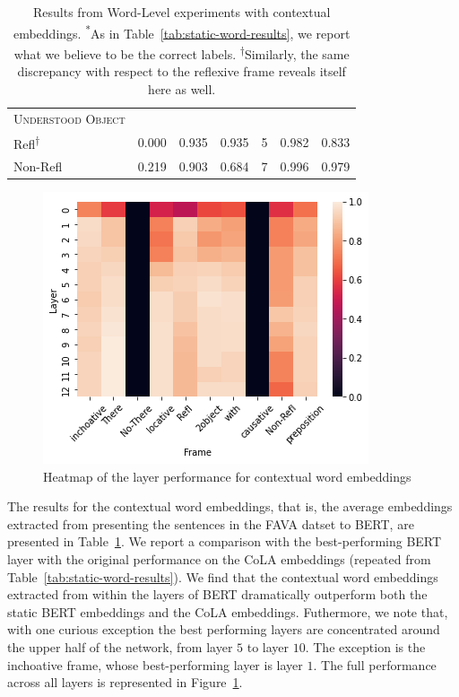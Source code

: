 \documentclass[11pt]{article}
\begin{document}
\begin{table}[!h]
\begin{tabular}{lrrrcrr}
\textsc{Understood Object }&         &       &            &           &        & \\
\hspace{1em} Refl\textsuperscript{$\dagger$} &          0.000 &      0.935 &      0.935 &           5 &     0.982 &              0.833 \\
\hspace{1em}    Non-Refl &          0.219 &      0.903 &      0.684 &           7 &     0.996 &              0.979 \\
\bottomrule
\end{tabular}
\caption{Results from Word-Level experiments with contextual embeddings. \textsuperscript{*}As in Table~\protect\ref{tab:static-word-results}, we report what we believe to be the correct labels.  \textsuperscript{$\dagger$}Similarly, the same discrepancy with respect to the reflexive frame reveals itself here as well.}
\label{tab:contextual-word-results}
\end{table}

 \begin{figure}[htbp]
  \centering
  \includegraphics[width=.5\textwidth]{paper/figures/word-heat.png} 
  \caption{Heatmap of the layer performance for contextual word embeddings}
  \label{fig:wordheat}
\end{figure}




The results for the contextual word embeddings, that is, the average embeddings extracted from presenting the sentences in the FAVA datset to BERT, are presented in Table~\ref{tab:contextual-word-results}. We report a comparison with the best-performing BERT layer with the original performance on the CoLA embeddings (repeated from Table~\ref{tab:static-word-results}).  We find that the contextual word embeddings extracted from within the layers of BERT dramatically outperform both the static BERT embeddings and the CoLA embeddings.  Futhermore, we note that, with one curious exception the best performing layers are concentrated around the upper half of the network, from layer $5$ to layer $10$.  The exception is the inchoative frame, whose best-performing layer is layer $1$.  The full performance across all layers is represented in Figure~\ref{fig:wordheat}.
\end{document}

